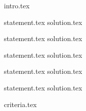 {intro.tex}

{statement.tex}
{solution.tex}

{statement.tex}
{solution.tex}

{statement.tex}
{solution.tex}

{statement.tex}
{solution.tex}


{statement.tex}
{solution.tex}

{criteria.tex}